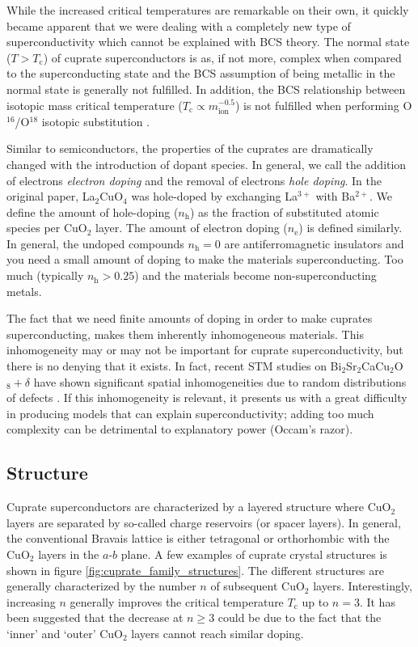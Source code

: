 While the increased critical temperatures are remarkable on their own, it quickly became apparent that we were dealing with a completely new type of superconductivity which cannot be explained with BCS theory. The normal state ($T > T_\text{c}$) of cuprate superconductors is as, if not more, complex when compared to the superconducting state and the BCS assumption of being metallic in the normal state is generally not fulfilled. In addition, the BCS relationship between isotopic mass critical temperature ($T_\text{c} \propto m_\text{ion}^{-0.5}$) is not fulfilled when performing O$^{16}$/O$^{18}$ isotopic substitution \cite{Suryadijaya2005}.

Similar to semiconductors, the properties of the cuprates are dramatically changed with the introduction of dopant species. In general, we call the addition of electrons \emph{electron doping} and the removal of electrons \emph{hole doping}. In the original paper, La$_2$CuO$_4$ was hole-doped by exchanging La$^{3+}$ with Ba$^{2+}$. We define the amount of hole-doping ($n_\text{h}$) as the fraction of substituted atomic species per CuO$_2$ layer. The amount of electron doping ($n_\text{e}$) is defined similarly. In general, the undoped compounds $n_\text{h} = 0$ are antiferromagnetic insulators and you need a small amount of doping to make the materials superconducting. Too much (typically $n_\text{h} > 0.25$) and the materials become non-superconducting metals. 

The fact that we need finite amounts of doping in order to make cuprates superconducting, makes them inherently inhomogeneous materials. This inhomogeneity may or may not be important for cuprate superconductivity, but there is no denying that it exists. In fact, recent STM studies on Bi$_2$Sr$_2$CaCu$_2$O$_8+\delta$ have shown significant spatial inhomogeneities due to random distributions of defects \cite{Ruan2018}. If this inhomogeneity is relevant, it presents us with a great difficulty in producing models that can explain superconductivity; adding too much complexity can be detrimental to explanatory power (Occam's razor).

\subsection{Structure}
Cuprate superconductors are characterized by a layered structure where CuO$_2$ layers are separated by so-called charge reservoirs (or spacer layers). In general, the conventional Bravais lattice is either tetragonal or orthorhombic with the CuO$_2$ layers in the $a$-$b$ plane. A few examples of cuprate crystal structures is shown in figure \ref{fig:cuprate_family_structures}. The different structures are generally characterized by the number $n$ of subsequent CuO$_2$ layers. Interestingly, increasing $n$ generally improves the critical temperature $T_\text{c}$ up to $n = 3$. It has been suggested that the decrease at $n \geq 3$ could be due to the fact that the `inner' and `outer' CuO$_2$ layers cannot reach similar doping.

